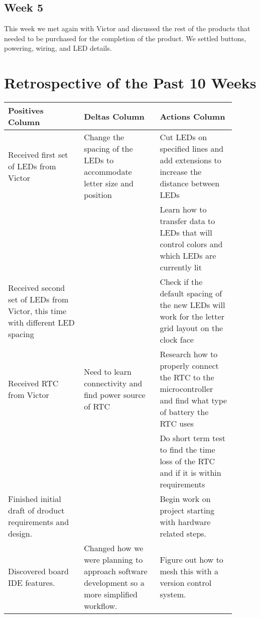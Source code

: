 \documentclass[onecolumn, draftclsnofoot,10pt, compsoc]{IEEEtran}
\begin{document}
\subsection{Week 5}
This week we met again with Victor and discussed the rest of the products that needed to be purchased for the completion of the product.
We settled buttons, powering, wiring, and LED details.

\newpage
\section{Retrospective of the Past 10 Weeks}
\vspace{2mm}
\begin{center}
\begin{tabular}{| p{0.3\linewidth} | p{0.3\linewidth} | p{0.3\linewidth} |}
\hline
Positives Column &
Deltas Column &
Actions Column \\
\hline
Received first set of LEDs from Victor &
Change the spacing of the LEDs to accommodate letter size and position &
Cut LEDs on specified lines and add extensions to increase the distance between LEDs \\
\hline
 &
 &
Learn how to transfer data to LEDs that will control colors and which LEDs are currently lit \\
\hline
Received second set of LEDs from Victor, this time with different LED spacing &
 &
Check if the default spacing of the new LEDs will work for the letter grid layout on the clock face \\
\hline
Received RTC from Victor &
Need to learn connectivity and find power source of RTC &
Research how to properly connect the RTC to the microcontroller and find what type of battery the RTC uses \\
\hline
 &
 &
Do short term test to find the time loss of the RTC and if it is within requirements \\
\hline
Finished initial draft of droduct requirements and design. &
&
Begin work on project starting with hardware related steps. \\
\hline
Discovered board IDE features. &
Changed how we were planning to approach software development so a more simplified workflow. &
Figure out how to mesh this with a version control system. \\
\hline


\end{tabular}
\end{center}
\end{document}
